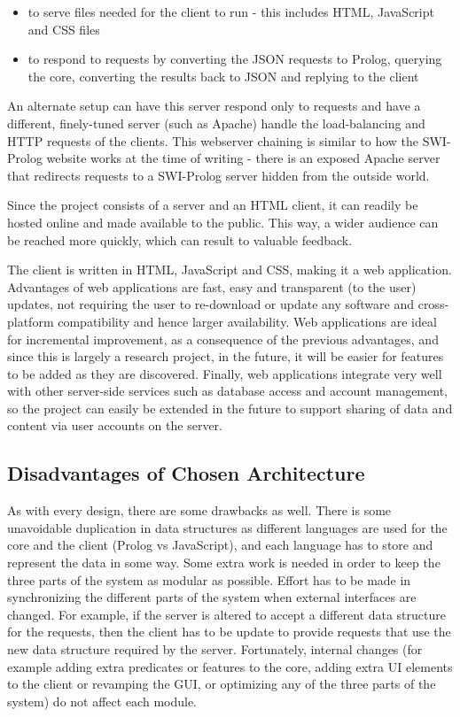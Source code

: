 \documentclass[11pt,twoside,a4paper]{report}
\begin{document}
\begin{itemize}
\item
to serve files needed for the client to run - this includes HTML, JavaScript and CSS files
\item
to respond to requests by converting the JSON requests to Prolog, querying the core, converting the results back to JSON and replying to the client
\end{itemize}

An alternate setup can have this server respond only to requests and have a different, finely-tuned server (such as Apache) handle the load-balancing and HTTP requests of the clients. This webserver chaining is similar to how the SWI-Prolog website works at the time of writing - there is an exposed Apache server that redirects requests to a SWI-Prolog server hidden from the outside world. 

Since the project consists of a server and an HTML client, it can readily be hosted online and made available to the public. This way, a wider audience can be reached more quickly, which can result to valuable feedback.

The client is written in HTML, JavaScript and CSS, making it a web application. Advantages of web applications are fast, easy and transparent (to the user) updates, not requiring the user to re-download or update any software and cross-platform compatibility and hence larger availability. Web applications are ideal for incremental improvement, as a consequence of the previous advantages, and since this is largely a research project, in the future, it will be easier for features to be added as they are discovered. Finally, web applications integrate very well with other server-side services such as database access and account management, so the project can easily be extended in the future to support sharing of data and content via user accounts on the server.

\subsection{Disadvantages of Chosen Architecture}
As with every design, there are some drawbacks as well. There is some unavoidable duplication in data structures as different languages are used for the core and the client (Prolog vs JavaScript), and each language has to store and represent the data in some way. Some extra work is needed in order to keep the three parts of the system as modular as possible. Effort has to be made in synchronizing the different parts of the system when external interfaces are changed. For example, if the server is altered to accept a different data structure for the requests, then the client has to be update to provide requests that use the new data structure required by the server. Fortunately, internal changes (for example adding extra predicates or features to the core, adding extra UI elements to the client or revamping the GUI, or optimizing any of the three parts of the system) do not affect each module.
\end{document}
